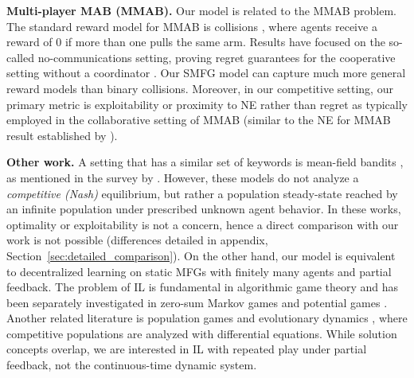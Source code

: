 \textbf{Multi-player MAB (MMAB).}
Our model is related to the MMAB problem.
The standard reward model for MMAB is collisions \citep{anandkumar2011distributed}, where agents receive a reward of 0 if more than one pulls the same arm.
Results have focused on the so-called no-communications setting, proving regret guarantees for the cooperative setting without a coordinator \citep{avner2014concurrent,rosenski2016multi, bubeck2021cooperative}.
Our SMFG model can capture much more general reward models than binary collisions.
Moreover, in our competitive setting, our primary metric is exploitability or proximity to NE rather than regret as typically employed in the collaborative setting of MMAB (similar to the NE for MMAB result established by \citet{lugosi2022multiplayer}).

\textbf{Other work.}
A setting that has a similar set of keywords is mean-field bandits \citep{gummadi2013mean,wang2021mean}, as mentioned in the survey by \citet{lauriere2022learning}.
However, these models do not analyze a \emph{competitive (Nash)} equilibrium, but rather a population steady-state reached by an infinite population under prescribed unknown agent behavior.
In these works, optimality or exploitability is not a concern, hence a direct comparison with our work is not possible (differences detailed in appendix, Section~\ref{sec:detailed_comparison}).
On the other hand, our model is equivalent to decentralized learning on static MFGs \citep{lauriere2022learning} with finitely many agents and partial feedback.
The problem of IL is fundamental in algorithmic game theory and has been separately investigated in zero-sum Markov games \citep{daskalakis2020independent, sayin2021decentralized, ozdaglar2021independent} and potential games \citep{ding2022independent, heliou2017learning,alatur2024independent}.
Another related literature is population games and evolutionary dynamics \citep{sandholm2015population, quijano2017role}, where competitive populations are analyzed with differential equations.
While solution concepts overlap, we are interested in IL with repeated play under partial feedback, not the continuous-time dynamic system.